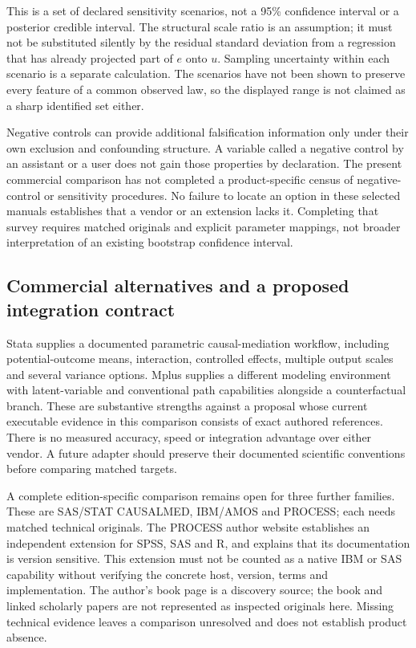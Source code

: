 This is a set of declared sensitivity scenarios, not a 95\% confidence interval or a posterior credible interval. The structural scale ratio is an assumption; it must not be substituted silently by the residual standard deviation from a regression that has already projected part of $e$ onto $u$. Sampling uncertainty within each scenario is a separate calculation. The scenarios have not been shown to preserve every feature of a common observed law, so the displayed range is not claimed as a sharp identified set either.

Negative controls can provide additional falsification information only under their own exclusion and confounding structure. A variable called a negative control by an assistant or a user does not gain those properties by declaration. The present commercial comparison has not completed a product-specific census of negative-control or sensitivity procedures. No failure to locate an option in these selected manuals establishes that a vendor or an extension lacks it. Completing that survey requires matched originals and explicit parameter mappings, not broader interpretation of an existing bootstrap confidence interval.

\subsection{Commercial alternatives and a proposed integration contract}
\label{exec20:med-integration}
Stata supplies a documented parametric causal-mediation workflow, including potential-outcome means, interaction, controlled effects, multiple output scales and several variance options. Mplus supplies a different modeling environment with latent-variable and conventional path capabilities alongside a counterfactual branch. These are substantive strengths against a proposal whose current executable evidence in this comparison consists of exact authored references. There is no measured accuracy, speed or integration advantage over either vendor. A future adapter should preserve their documented scientific conventions before comparing matched targets.

A complete edition-specific comparison remains open for three further families. These are SAS/STAT CAUSALMED, IBM/AMOS and PROCESS; each needs matched technical originals. The PROCESS author website establishes an independent extension for SPSS, SAS and R, and explains that its documentation is version sensitive. This extension must not be counted as a native IBM or SAS capability without verifying the concrete host, version, terms and implementation. The author's book page is a discovery source; the book and linked scholarly papers are not represented as inspected originals here. Missing technical evidence leaves a comparison unresolved and does not establish product absence.~\citep{exec20_med_process_lead}

